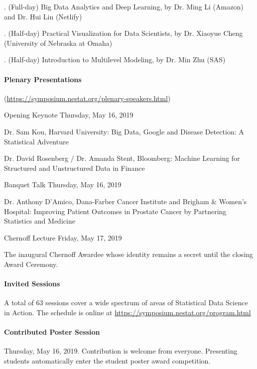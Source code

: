 \documentclass[12pt]{article}
\begin{document}
. (Full-day) Big Data Analytics and Deep Learning, by Dr. Ming Li (Amazon) and Dr. Hui Lin (Netlify)

. (Half-day) Practical Visualization for Data Scientists, by Dr. Xiaoyue Cheng (University of Nebraska at Omaha)

. (Half-day) Introduction to Multilevel Modeling, by Dr. Min Zhu (SAS)

\paragraph{Plenary Presentations} (\url{https://symposium.nestat.org/plenary-speakers.html})

\noindent\textsf{Opening Keynote} Thursday, May 16, 2019

Dr. Sam Kou, Harvard University: Big Data, Google and Disease Detection: A Statistical Adventure

Dr. David Rosenberg / Dr. Amanda Stent, Bloomberg: Machine Learning for Structured and Unstructured Data in Finance

\noindent\textsf{Banquet Talk} Thursday, May 16, 2019

Dr. Anthony D'Amico,   Dana-Farber Cancer Institute and Brigham \& Women's Hospital: Improving Patient Outcomes in Prostate Cancer by Partnering Statistics and Medicine

\noindent\textsf{Chernoff Lecture} Friday, May 17, 2019

The inaugural Chernoff Awardee whose identity remains a secret until the closing Award Ceremony.

\paragraph{Invited Sessions}
A total of 63 sessions cover a wide spectrum of areas of Statistical Data Science in Action. %
The schedule is online at \url{https://symposium.nestat.org/program.html}

\paragraph{Contributed Poster Session} Thursday, May 16, 2019.
Contribution is welcome from everyone.
Presenting students automatically enter the student poster award competition.
\end{document}
